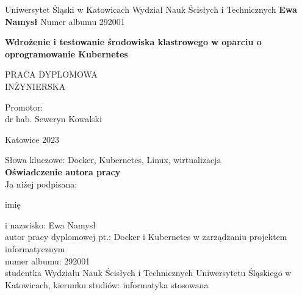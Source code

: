 \iffalse
    \begin{titlepage}
    \begin{center}
    {\Large Uniwersytet Śląski w Katowicach}
    \vskip 0.7cm
    {\Large  Wydział Nauk Ścisłych i Technicznych}
    \vskip 2.5cm
    {\Large \bf Ewa Namysł}
    \vskip 1cm
    {\large Numer albumu 292001}
    \vskip 2.5cm
    \begin{doublespace}
    {\huge \bf Wdrożenie i testowanie środowiska klastrowego w oparciu o oprogramowanie Kubernetes}
    \end{doublespace}
    \vskip 2.5cm
    {\large PRACA DYPLOMOWA\\INŻYNIERSKA}
    \end{center}
    \vspace{3.5cm}
    \begin{flushright}
    \parbox{6.5cm}{Promotor: \\
    dr hab. Seweryn Kowalski}
    \end{flushright}
    \vspace{1.5cm}
    \begin{center}
    Katowice 2023
    \end{center}
    
    \newpage
    \thispagestyle{empty}
    \begin{small}
    \noindent
    Słowa kluczowe: Docker, Kubernetes, Linux, wirtualizacja\\
    
    \textbf{Oświadczenie autora pracy}\\[0.5cm]
    Ja niżej podpisana:\\
    
    
    {\raggedright imię} i nazwisko: Ewa Namysł\\
    autor pracy dyplomowej pt.: Docker i Kubernetes w zarządzaniu projektem informatycznym\\
    numer albumu: 292001\\
    studentka Wydziału Nauk Ścisłych i Technicznych Uniwersytetu Śląskiego w Katowicach, kierunku studiów: informatyka stosowana\\
    

\end{small}
\end{titlepage}
